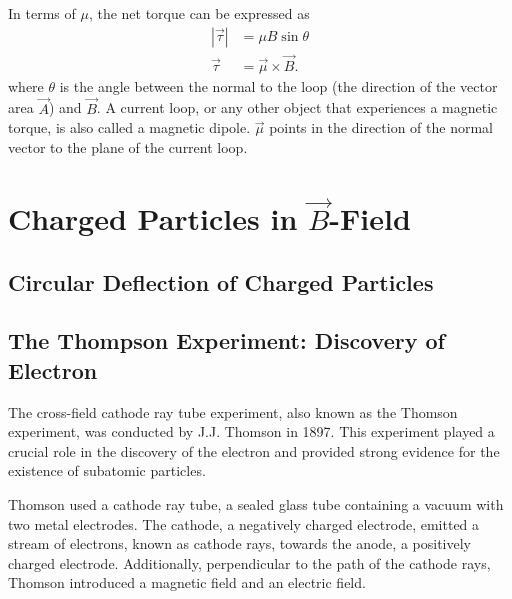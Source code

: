 \documentclass[12pt,b4paper]{article}
\begin{document}
In terms of $\mu$, the net torque can be expressed as
\begin{align}
    |\vec{\tau}|&=\mu B\sin\theta\\
    \vec{\tau}&=\vec{\mu}\times\vec{B}.
\end{align}
where $\theta$ is the angle between the normal to the loop (the direction of the vector area $\vec{A}$) and $\vec{B}$. A current loop, or any other object that experiences a magnetic torque, is also called a magnetic dipole. $\vec{\mu}$ points in the direction of the normal vector to the plane of the current loop.
\section{Charged Particles in $\vec{B}$-Field}
\subsection{Circular Deflection of Charged Particles}
\subsection{The Thompson Experiment: Discovery of Electron}
The cross-field cathode ray tube experiment, also known as the Thomson experiment, was conducted by J.J. Thomson in 1897. This experiment played a crucial role in the discovery of the electron and provided strong evidence for the existence of subatomic particles.

Thomson used a cathode ray tube, a sealed glass tube containing a vacuum with two metal electrodes. The cathode, a negatively charged electrode, emitted a stream of electrons, known as cathode rays, towards the anode, a positively charged electrode. Additionally, perpendicular to the path of the cathode rays, Thomson introduced a magnetic field and an electric field.
\end{document}
